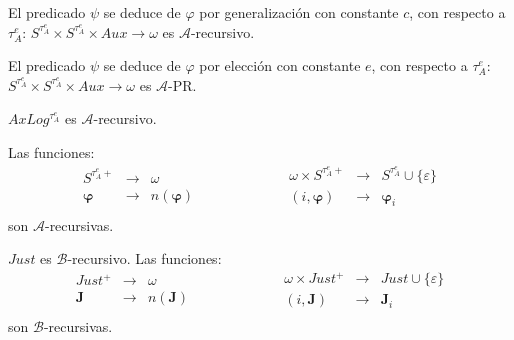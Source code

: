   \begin{lemma} \label{lemma_104}
    \PN El predicado \CL$\psi$ se deduce de $\varphi$ por generalización con constante $c$, con respecto a
    $\tau^{e}_{A}$\CR: $S^{\tau_{A}^{e}} \times S^{\tau_{A}^{e}} \times Aux \rightarrow \omega$ es $\mathcal{A}$-recursivo.
  \end{lemma}

  \begin{lemma} \label{lemma_105}
    \PN El predicado \CL$\psi$ se deduce de $\varphi$ por elección con constante $e$, con respecto a $\tau^{e}_{A}$\CR:
    $S^{\tau_{A}^{e}} \times S^{\tau_{A}^{e}} \times Aux \rightarrow \omega$ es $\mathcal{A}$-PR.
  \end{lemma}

  \begin{lemma} \label{lemma_106}
    \PN $AxLog^{\tau_{A}^{e}}$ es $\mathcal{A}$-recursivo.
  \end{lemma}

  \begin{lemma} \label{lemma_107}
    \PN Las funciones:
    \begin{equation*}
      \begin{aligned}
        S^{\tau_{A}^{e}+} &\rightarrow& \omega \\
        \pmb{\varphi} &\rightarrow& n(\pmb{\varphi}) \\
      \end{aligned}
      \qquad\qquad\qquad
      \begin{aligned}
        \omega \times S^{\tau_{A}^{e}+} &\rightarrow& S^{\tau_{A}^{e}} \cup \{\varepsilon\} \\
        (i, \pmb{\varphi}) &\rightarrow& \pmb{\varphi}_{i} \\
      \end{aligned}
    \end{equation*}
    \PN son $\mathcal{A}$-recursivas.
  \end{lemma}

  \begin{lemma} \label{lemma_108}
    \PN $Just$ es $\mathcal{B}$-recursivo. Las funciones:
    \begin{equation*}
      \begin{aligned}
        Just^{+} &\rightarrow& \omega \\
        \mathbf{J} &\rightarrow& n(\mathbf{J}) \\
      \end{aligned}
      \qquad\qquad\qquad
      \begin{aligned}
        \omega \times Just^{+} &\rightarrow& Just \cup \{\varepsilon\} \\
        (i, \mathbf{J}) &\rightarrow& \mathbf{J}_{i} \\
      \end{aligned}
    \end{equation*}
    \PN son $\mathcal{B}$-recursivas.
  \end{lemma}

